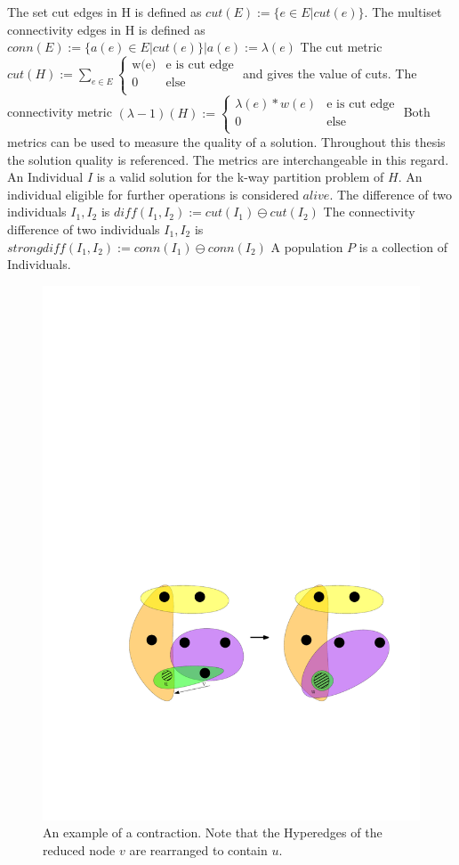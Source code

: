 \documentclass[a4paper,12pt,bibtotoc,titlepage, liststotoc,BCOR7mm,headsepline,pointlessnumbers]{scrbook}
\numberwithin{equation}{section}
\begin{document}
The set cut edges in H is defined as
$cut(E) := \{e \in E | cut(e) \}$.
The multiset connectivity edges in H is defined as
$conn(E) := \{a(e) \in E | cut(e) \} |a(e) := \lambda(e)$
The cut metric $cut(H) := \sum_{e \in E} 
\begin{cases}
       \text{w(e)} & \text{e is cut edge}\\
       \text{0} &\text{else}\\
     \end{cases}$  and gives the value of cuts.
The connectivity metric $(\lambda -1)(H) := \begin{cases}
       \text{$\lambda(e)*w(e)$} & \text{e is cut edge}\\
       \text{0} &\text{else}\\
     \end{cases}$
Both metrics can be used to measure the quality of a solution. Throughout this thesis the solution quality is referenced. The metrics are interchangeable in this regard.
An Individual $I$ is a valid solution for the k-way partition problem of $H$.
An individual eligible for further operations is considered $alive$.
The difference of two individuals $I_1, I_2$ is $diff(I_1, I_2) := cut(I_1) \ominus cut(I_2)$
The connectivity difference of two individuals $I_1, I_2$ is $strongdiff(I_1, I_2) := conn(I_1) \ominus conn(I_2)$
A population $P$ is a collection of Individuals.

\begin{figure}[t!] 
    \vspace*{-.25cm}
  \centering
   \includegraphics[width=.8\textwidth]{Ipe/Coarsening_Example.pdf} %
  \caption{An example of a contraction. Note that the Hyperedges of the reduced node $v$ are rearranged to contain $u$.}\label{fig:img.png}
    \vspace*{-.5cm}
\end{figure}
\end{document}
